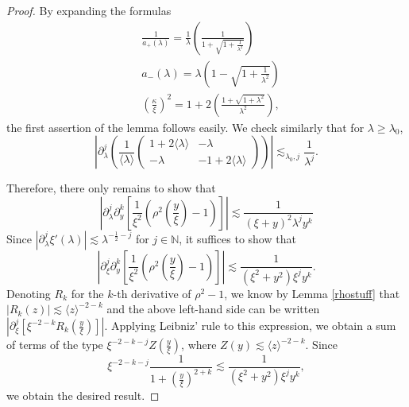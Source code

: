 \documentclass[11 pt]{amsart}
\theoremstyle{definition}
\theoremstyle{remark}
\numberwithin{equation}{section}
\begin{document}
\begin{proof}
By expanding the formulas
\begin{align*}
& \frac{1}{a_+ (\lambda)} = \frac{1}{\lambda} \left( \frac{1}{1 + \sqrt{1 + \frac{1}{\lambda^2}}} \right) \\
& a_- (\lambda) = \lambda \left( 1 - \sqrt{1 + \frac{1}{\lambda^2}} \right) \\
& \left( \frac{\kappa}{\xi} \right)^2 = 1 + 2 \left( \frac{1 + \sqrt{1 +
     \lambda^2}}{\lambda^2} \right),
\end{align*}
the first assertion of the lemma follows easily.
We check similarly that for
  $\lambda \geqslant \lambda_0$,
  \[ \left| \partial_{\lambda}^j \left( \frac{1}{\langle \lambda \rangle}
     \left(\begin{array}{cc}
       1 + 2 \langle \lambda \rangle & - \lambda\\
       - \lambda & - 1 + 2 \langle \lambda \rangle
     \end{array}\right) \right) \right| \lesssim_{\lambda_0, j}
     \frac{1}{\lambda^j} . \]

Therefore, there only remains to show that
$$
\left| \partial_{\lambda}^j \partial_y^k \left[ \frac{1}{\xi^2} \left( \rho^2
  \left( \frac{y}{\xi} \right) - 1 \right) \right] \right| \lesssim \frac{1}{(\xi + y)^2\lambda^j y^k}
$$
Since $|\partial_\lambda^j \xi'(\lambda)| \lesssim \lambda^{-\frac 12 - j}$ for $j \in \mathbb{N}$, it suffices to show that
$$
\left| \partial_{\xi}^j \partial_y^k \left[ \frac{1}{\xi^2} \left( \rho^2
  \left( \frac{y}{\xi} \right) - 1 \right) \right] \right| \lesssim \frac{1}{(\xi^2 + y^2)\xi^j y^k}.
$$
Denoting $R_k$ for the $k$-th derivative of $\rho^2-1$, we know by Lemma \ref{rhostuff} that $|R_k(z)| \lesssim \langle z \rangle^{-2-k}$ and the above left-hand side can be written $\left| \partial_{\xi}^j \left[ \xi^{-2-k} R_k 
  \left( \frac{y}{\xi} \right)  \right] \right|$. Applying Leibniz' rule to this expression, we obtain a sum of terms of the type
$\xi^{-2-k-j} Z \left( \frac{y}{\xi} \right)$, where $Z(y) \lesssim \langle z \rangle^{-2-k}$. Since
$$
\xi^{-2-k-j} \frac{1}{1 + \left( \frac{y}{\xi} \right)^{2+k}} \lesssim \frac{1}{(\xi^2 + y^2)\xi^j y^k},
$$
we obtain the desired result.
\end{proof}
\end{document}
